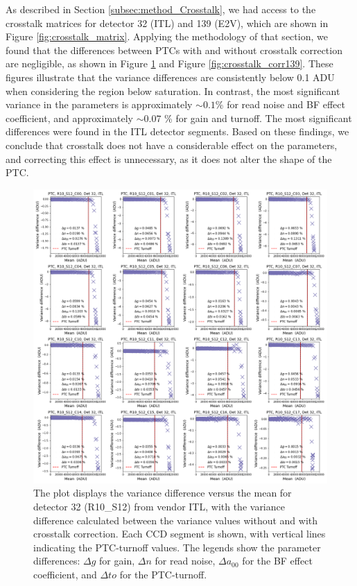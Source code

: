 \vspace{3mm}

As described in Section \ref{subsec:method_Crosstalk}, we had access to the crosstalk matrices for detector 32 (ITL) and 139 (E2V), which are shown in Figure \ref{fig:crosstalk_matrix}. Applying the methodology of that section, we found that the differences between PTCs with and without crosstalk correction are negligible, as shown in Figure \ref{fig:crosstalk_corr32} and Figure \ref{fig:crosstalk_corr139}. These figures illustrate that the variance differences are consistently below 0.1 ADU when considering the region below saturation. In contrast, the most significant variance in the parameters is approximately $\sim 0.1$\% for read noise and BF effect coefficient, and approximately $\sim 0.07$ \% for gain and turnoff. The most significant differences were found in the ITL detector segments. Based on these findings, we conclude that crosstalk does not have a considerable effect on the parameters, and correcting this effect is unnecessary, as it does not alter the shape of the PTC.


\begin{figure}[!htb]
    \centering
    \includegraphics[width=\textwidth]{Figures/ptc_crosstalk32.png}
    \caption{The plot displays the variance difference versus the mean for detector 32 (R10\_S12) from vendor ITL, with the variance difference calculated between the variance values without and with crosstalk correction. Each CCD segment is shown, with vertical lines indicating the PTC-turnoff values. The legends show the parameter differences: $\Delta g$ for gain, $\Delta n$ for read noise, $\Delta a_{00}$ for the BF effect coefficient, and $\Delta to$ for the PTC-turnoff.}
    \label{fig:crosstalk_corr32}
\end{figure}


